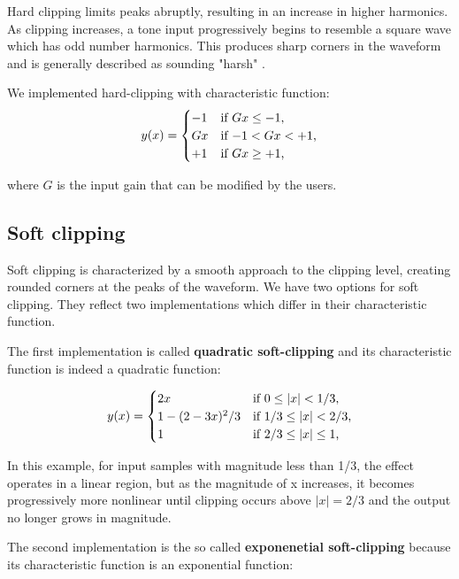 \documentclass[letterpaper, 12pt]{article}
\begin{document}
	
	Hard clipping limits peaks abruptly, resulting in an increase in higher harmonics. As clipping increases, a tone input progressively begins to resemble a square wave which has odd number harmonics. This produces sharp corners in the waveform and is generally described as sounding "harsh" \cite{distortion}. 
	
	We implemented hard-clipping with characteristic function:
	\begin{equation}
		y(x) =     
		\begin{cases}
			-1 & \text{if $ Gx \leq -1 $,}\\
			Gx & \text{if $ -1 < Gx < +1 $,}\\
			+1 & \text{if $ Gx \geq +1 $,}\\
		\end{cases}       
	\end{equation}
	
	where $G$ is the input gain that can be modified by the users.
	
	\subsection*{Soft clipping}
	
	Soft clipping is characterized by a smooth approach to the clipping level, creating rounded corners at the peaks of the waveform. We have two options for soft clipping. They reflect two implementations which differ in their characteristic function.
	
	The first implementation is called \textbf{quadratic soft-clipping} and its characteristic function is indeed a quadratic function: 
	
	\begin{equation}
		y(x) =     
		\begin{cases}
			2x & \text{if $ 0 \leq |x| < 1/3 $,}\\
			1 -(2-3x)^2 / 3& \text{if $ 1/3 \leq |x| < 2/3 $,}\\
			1 & \text{if $ 2/3 \leq |x| \leq 1 $,}\\
		\end{cases}       
	\end{equation}
	
	In this example, for input samples with magnitude less than 1/3, the
	effect operates in a linear region, but as the magnitude of x increases, it becomes progressively more nonlinear until clipping occurs above $|x| = 2/3$ and the output no longer grows in magnitude. 
	
	The second implementation is the so called \textbf{exponenetial soft-clipping} because its characteristic function is an exponential function:
	
\end{document}
